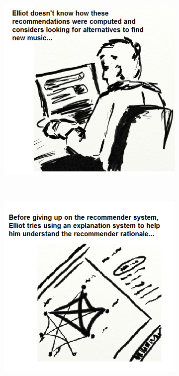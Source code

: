 \begin{figure}
\begin{subfigure}[t]{0.4\textwidth}
					\includegraphics[width=\textwidth]{img/storyboard02}
					\caption{}
					\label{figure:storyboard02}
	\end{subfigure}
	~
	\begin{subfigure}[t]{0.4\textwidth}
					\centering
					\includegraphics[width=\textwidth]{img/storyboard03}

\end{subfigure}
\end{figure}
